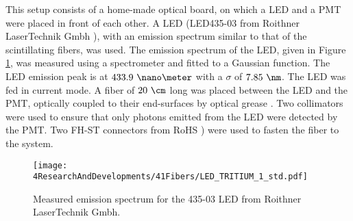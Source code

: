 This setup consists of a home-made optical board, on which a LED and a PMT were placed in front of each other. A LED (LED435-03 from Roithner LaserTechnik Gmbh \cite{LEDRLT}), with an emission spectrum similar to that of the scintillating fibers, was used. The emission spectrum of the LED, given in Figure \ref{fig:LEDSpectrumTritium}, was measured using a spectrometer and fitted to a Gaussian function. The LED emission peak is at $433.9~\nano\meter$ with a $\sigma$ of $7.85~\nm$. The LED was fed in current mode. A fiber of $20~\cm$ long was placed between the LED and the PMT, optically coupled to their end-surfaces by optical grease \cite{OpticalGrease}. Two collimators were used to ensure that only photons emitted from the LED were detected by the PMT. Two FH-ST connectors from RoHS \cite{}) were used to fasten the fiber to the system. 

\begin{figure}[h]
\centering
\texttt{[image: 4ResearchAndDevelopments/41Fibers/LED\_TRITIUM\_1\_std.pdf]}
\caption{Measured emission spectrum for the 435-03 LED from Roithner LaserTechnik Gmbh.\label{fig:LEDSpectrumTritium}}
\end{figure}